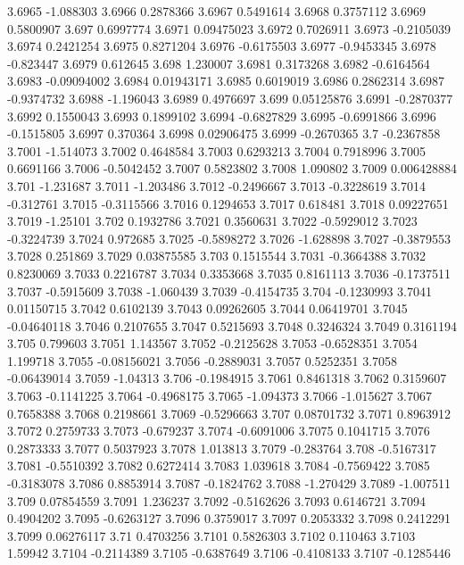 3.6965  -1.088303
3.6966  0.2878366
3.6967  0.5491614
3.6968  0.3757112
3.6969  0.5800907
3.697  0.6997774
3.6971  0.09475023
3.6972  0.7026911
3.6973  -0.2105039
3.6974  0.2421254
3.6975  0.8271204
3.6976  -0.6175503
3.6977  -0.9453345
3.6978  -0.823447
3.6979  0.612645
3.698  1.230007
3.6981  0.3173268
3.6982  -0.6164564
3.6983  -0.09094002
3.6984  0.01943171
3.6985  0.6019019
3.6986  0.2862314
3.6987  -0.9374732
3.6988  -1.196043
3.6989  0.4976697
3.699  0.05125876
3.6991  -0.2870377
3.6992  0.1550043
3.6993  0.1899102
3.6994  -0.6827829
3.6995  -0.6991866
3.6996  -0.1515805
3.6997  0.370364
3.6998  0.02906475
3.6999  -0.2670365
3.7  -0.2367858
3.7001  -1.514073
3.7002  0.4648584
3.7003  0.6293213
3.7004  0.7918996
3.7005  0.6691166
3.7006  -0.5042452
3.7007  0.5823802
3.7008  1.090802
3.7009  0.006428884
3.701  -1.231687
3.7011  -1.203486
3.7012  -0.2496667
3.7013  -0.3228619
3.7014  -0.312761
3.7015  -0.3115566
3.7016  0.1294653
3.7017  0.618481
3.7018  0.09227651
3.7019  -1.25101
3.702  0.1932786
3.7021  0.3560631
3.7022  -0.5929012
3.7023  -0.3224739
3.7024  0.972685
3.7025  -0.5898272
3.7026  -1.628898
3.7027  -0.3879553
3.7028  0.251869
3.7029  0.03875585
3.703  0.1515544
3.7031  -0.3664388
3.7032  0.8230069
3.7033  0.2216787
3.7034  0.3353668
3.7035  0.8161113
3.7036  -0.1737511
3.7037  -0.5915609
3.7038  -1.060439
3.7039  -0.4154735
3.704  -0.1230993
3.7041  0.01150715
3.7042  0.6102139
3.7043  0.09262605
3.7044  0.06419701
3.7045  -0.04640118
3.7046  0.2107655
3.7047  0.5215693
3.7048  0.3246324
3.7049  0.3161194
3.705  0.799603
3.7051  1.143567
3.7052  -0.2125628
3.7053  -0.6528351
3.7054  1.199718
3.7055  -0.08156021
3.7056  -0.2889031
3.7057  0.5252351
3.7058  -0.06439014
3.7059  -1.04313
3.706  -0.1984915
3.7061  0.8461318
3.7062  0.3159607
3.7063  -0.1141225
3.7064  -0.4968175
3.7065  -1.094373
3.7066  -1.015627
3.7067  0.7658388
3.7068  0.2198661
3.7069  -0.5296663
3.707  0.08701732
3.7071  0.8963912
3.7072  0.2759733
3.7073  -0.679237
3.7074  -0.6091006
3.7075  0.1041715
3.7076  0.2873333
3.7077  0.5037923
3.7078  1.013813
3.7079  -0.283764
3.708  -0.5167317
3.7081  -0.5510392
3.7082  0.6272414
3.7083  1.039618
3.7084  -0.7569422
3.7085  -0.3183078
3.7086  0.8853914
3.7087  -0.1824762
3.7088  -1.270429
3.7089  -1.007511
3.709  0.07854559
3.7091  1.236237
3.7092  -0.5162626
3.7093  0.6146721
3.7094  0.4904202
3.7095  -0.6263127
3.7096  0.3759017
3.7097  0.2053332
3.7098  0.2412291
3.7099  0.06276117
3.71  0.4703256
3.7101  0.5826303
3.7102  0.110463
3.7103  1.59942
3.7104  -0.2114389
3.7105  -0.6387649
3.7106  -0.4108133
3.7107  -0.1285446
